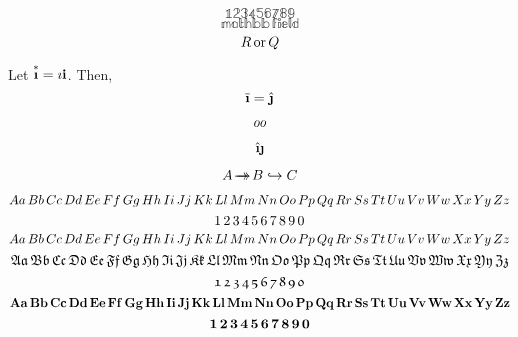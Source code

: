 \documentclass[11pt]{article}
\begin{document}
\begin{comment}
    \begin{itemize}
        \newcommand{\tallthing}{\begin{array}{c}1\\2\end{array}}
        \newcommand{\deltest}[1]{\call{#1}{#1}\,\call{#1}{\tallthing}}
        \item $\deltest{Par}$
        \item $\deltest{Paar}$
        \item $\deltest{Squ}$
        \item $\deltest{Sqqu}$
        \item $\deltest{PSqu}$
        \item $\deltest{SPar}$
        \item $\deltest{Cur}$
        \item $\deltest{Cuur}$
        \item $\deltest{Abs}$
        \item $\deltest{Nor}$
        \item $\deltest{Ceil}$
        \item $\deltest{Flo}$
        \item $\deltest{Ang}$
        \item $\deltest{Bra}$
        \item $\deltest{Ket}$
        \item $\mkset{f}{\ph}$
        \item $\BraKet{\CH}{\Psi}$
    \end{itemize}
\end{comment}


\[ \mathbb{123456789} \]
\[ \mathbb{mathbb\,field} \]
\[ \R \OR \Q \]

\begin{thm}
    Let $\overset{*}{\vii}=\ii\vi$. Then,
    \[\ov{\vii} = \hat{\vjj}\]    
\end{thm}

\[ \StrGobbleLeft{foo}{1} \]

\[ \hat\vii \vjj \]

\[ A \srj B \inj C \]

\[ \fld{\alphabet} \]
\[ \fld{\numbers} \]
\[ \cat{\alphabet} \]
\[ \mathfrak{Aa\,Bb\,Cc\,Dd\,Ee\,Ff\,Gg\,Hh\,Ii\,Jj\,Kk\,Ll\,Mm\,Nn\,Oo\,Pp\,Qq\,Rr\,Ss\,Tt\,Uu\,Vv\,Ww\,Xx\,Yy\,Zz} \]
\[ \mathfrak{1\,2\,3\,4\,5\,6\,7\,8\,9\,0} \]
\[ \mathbf{Aa\,Bb\,Cc\,Dd\,Ee\,Ff\,Gg\,Hh\,Ii\,Jj\,Kk\,Ll\,Mm\,Nn\,Oo\,Pp\,Qq\,Rr\,Ss\,Tt\,Uu\,Vv\,Ww\,Xx\,Yy\,Zz} \]
\[ \mathbf{1\,2\,3\,4\,5\,6\,7\,8\,9\,0} \]
\end{document}

